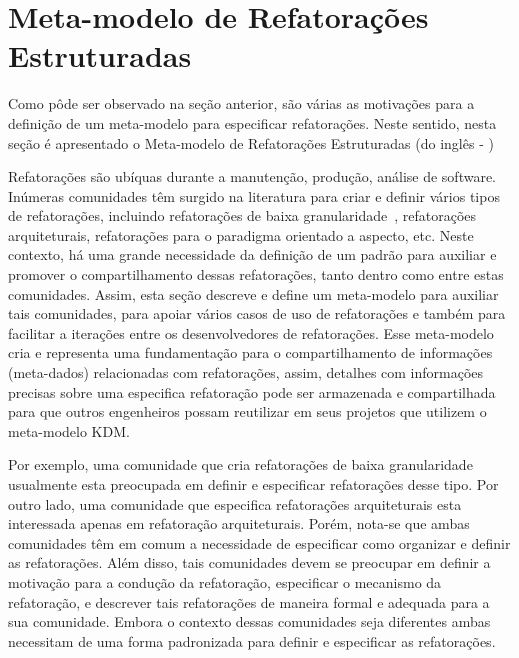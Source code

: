 
\section{Meta-modelo de Refatorações Estruturadas} %
\label{sec:meta_modelo_de_refatora_es_estruturadas_srm_do_ingl_s_structured refactoring meta-model_}

Como pôde ser observado na seção anterior, são várias as motivações para a definição de um meta-modelo para especificar refatorações. Neste sentido, nesta seção é apresentado o Meta-modelo de Refatorações Estruturadas (do inglês - )

Refatorações são ubíquas durante a manutenção, produção, análise de software. Inúmeras comunidades têm surgido na literatura para criar e definir vários tipos de refatorações, incluindo refatorações de baixa granularidade~\cite{Fowler1999, Demeyer1, Demeyer2}, refatorações arquiteturais, refatorações para o paradigma orientado a aspecto, etc. Neste contexto, há uma grande necessidade da definição de um padrão para auxiliar e promover o compartilhamento dessas refatorações, tanto dentro como entre estas comunidades. Assim, esta seção descreve e define um meta-modelo para auxiliar tais comunidades, para apoiar vários casos de uso de refatorações e também para facilitar a iterações entre os desenvolvedores de refatorações. Esse meta-modelo cria e representa uma fundamentação para o compartilhamento de informações (meta-dados) relacionadas com refatorações, assim, detalhes com informações precisas sobre uma especifica refatoração pode ser armazenada e compartilhada para que outros engenheiros possam reutilizar em seus projetos que utilizem o meta-modelo KDM.

Por exemplo, uma comunidade que cria refatorações de baixa granularidade usualmente esta preocupada em definir e especificar refatorações desse tipo. Por outro lado, uma comunidade que especifica refatorações arquiteturais esta interessada apenas em refatoração arquiteturais. Porém, nota-se que ambas comunidades têm em comum a necessidade de especificar como organizar e definir as refatorações. Além disso, tais comunidades devem se preocupar em definir a motivação para a condução da refatoração, especificar o mecanismo da refatoração, e descrever tais refatorações de maneira formal e adequada para a sua comunidade. Embora o contexto dessas comunidades seja diferentes ambas necessitam de uma forma padronizada para definir e especificar as refatorações. 

